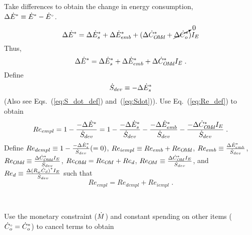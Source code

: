 \begin{landscape}
{Take differences to obtain the change in energy consumption, \\
$\Delta {\dot{E}}^* \equiv {\dot{E}}^* - {}{\dot{E}}^{\scriptscriptstyle \circ}$.
%
\begin{equation}
  \Delta {\dot{E}}^* = \Delta {\dot{E}}^*_s
                      + \Delta {\dot{E}}^*_{emb}
                      + (\Delta {\dot{C}}^*_{O\!M\!d}
                      + \cancelto{0}{\Delta {\dot{C}}^*_o}) I_E
\end{equation}
%
Thus, 
%
\begin{equation}
\Delta {\dot{E}}^* = \Delta {\dot{E}}^*_s + \Delta {\dot{E}}^*_{emb} + \Delta {\dot{C}}^*_{O\!M\!d} I_E \; .
\end{equation}
%
Define
%
\begin{equation} \label{eq:Sdot_def}
\dot{S}_{dev} \equiv -\Delta {\dot{E}}^*_s
\end{equation}
%
(Also see Eqs.~(\ref{eq:S_dot_def}) and~(\ref{eq:Sdot})). 
Use Eq.~(\ref{eq:Re_def}) to obtain
%
\begin{equation}
Re_{empl} = 1 - \frac{-\Delta {\dot{E}}^*}{\dot{S}_{dev}} 
          = 1 - \frac{-\Delta {\dot{E}}^*_s}{\dot{S}_{dev}} 
              - \frac{-\Delta {\dot{E}}^*_{emb}}{\dot{S}_{dev}}
              - \frac{-\Delta {\dot{C}}^*_{O\!M\!d} I_E}{\dot{S}_{dev}} \; .
\end{equation}
%
Define $Re_{dempl} \equiv 1 - \frac{-\Delta {\dot{E}}^*_s}{\dot{S}_{dev}} (= 0)$, 
$Re_{iempl} \equiv Re_{emb} + Re_{O\!M\!d}$, 
$Re_{emb} \equiv \frac{\Delta {\dot{E}}^*_{emb}}{\dot{S}_{dev}}$,
$Re_{O\!M\!d} \equiv \frac{\Delta {\dot{C}}^*_{O\!M\!d} I_E}{\dot{S}_{dev}}$, 
$Re_{O\!M\!d} = Re_{O\!M} + Re_d$,
$Re_{O\!M} \equiv \frac{\Delta {\dot{C}}^*_{O\!M} I_E}{\dot{S}_{dev}}$, and 
$Re_d \equiv \frac{\Delta {(R_\omega \dot{C}_d)}^* I_E}{\dot{S}_{dev}}$
such that
%
\begin{equation} \label{eq:Re_empl_def}
Re_{empl} = Re_{dempl} + Re_{iempl} \; .
\end{equation}
}
{
~
    
Use the monetary constraint ($\dot{M}$)
and constant spending on other items (${}{\dot{C}}^{\scriptscriptstyle \circ}_o = {\dot{C}}^*_o$) to cancel terms to obtain

}
\end{landscape}
